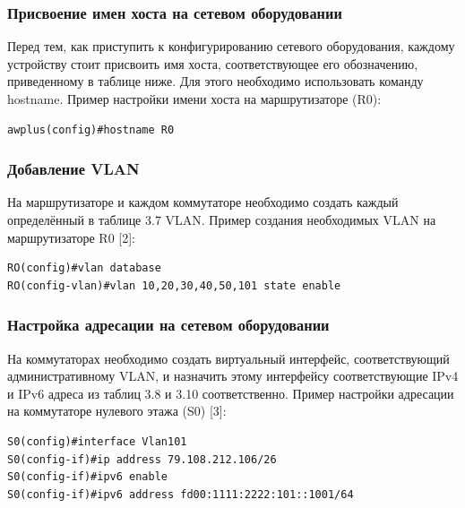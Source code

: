 %
%

    \subsubsection{Присвоение имен хоста на сетевом оборудовании}
    Перед тем, как приступить к конфигурированию сетевого оборудования,
    каждому устройству стоит присвоить имя хоста, соответствующее его обозначению, приведенному в таблице ниже.
    Для этого необходимо использовать команду hostname.
    Пример настройки имени хоста на маршрутизаторе (R0):
\begin{lstlisting}
awplus(config)#hostname R0
\end{lstlisting}

    \subsubsection{Добавление VLAN}
    На маршрутизаторе и каждом коммутаторе необходимо создать каждый определённый в таблице 3.7 VLAN.
    Пример создания необходимых VLAN на маршрутизаторе R0 [2]:
\begin{lstlisting}
RO(config)#vlan database
RO(config-vlan)#vlan 10,20,30,40,50,101 state enable
\end{lstlisting}

    \subsubsection{Настройка адресации на сетевом оборудовании}
    На коммутаторах необходимо создать виртуальный интерфейс, соответствующий административному VLAN,
    и назначить этому интерфейсу соответствующие IPv4 и IPv6 адреса из таблиц 3.8 и 3.10 соответственно.
    Пример настройки адресации на коммутаторе нулевого этажа (S0) [3]:
\begin{lstlisting}
S0(config)#interface Vlan101
S0(config-if)#ip address 79.108.212.106/26
S0(config-if)#ipv6 enable
S0(config-if)#ipv6 address fd00:1111:2222:101::1001/64
\end{lstlisting}

